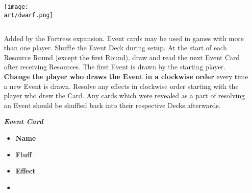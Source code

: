 \begin{multicols*}{2}
\vspace*{\fill}
\columnbreak
\begin{center}
  \texttt{[image: \\art/dwarf.png]}
\end{center}
\columnbreak

\subsection*{}
Added by the Fortress expansion.
Event cards may be used in games with more than one player.
Shuffle the Event Deck during setup.
At the start of each Resource Round (except the first Round), draw and read the next Event Card after receiving Resources.
The first Event is drawn by the starting player.
\textbf{Change the player who draws the Event in a clockwise order} every time a new Event is drawn.
Resolve any effects in clockwise order starting with the player who drew the Card.
Any cards which were revealed as a part of resolving an Event should be shuffled back into their respective Decks afterwards.

\medskip

\begin{minipage}[h]{\linewidth}
  \vspace{0.1pt}
  \centering
  \begin{scriptsize}
  \end{scriptsize}
  \footnotesize{\textbf{\textit{\textcolor{darkcandyapplered}{Event Card}}}}
  \scriptsize
  \begin{multicols}{2}
    \begin{itemize}
      \item[\textbf{1.}] \textbf{Name}
      \item[\textbf{2.}] \textbf{Fluff}
      \item[\textbf{3.}] \textbf{Effect}
      \item[\textbf{\phantom{.}}] \phantom{.}
    \end{itemize}
  \end{multicols}
\end{minipage}


\end{multicols*}
